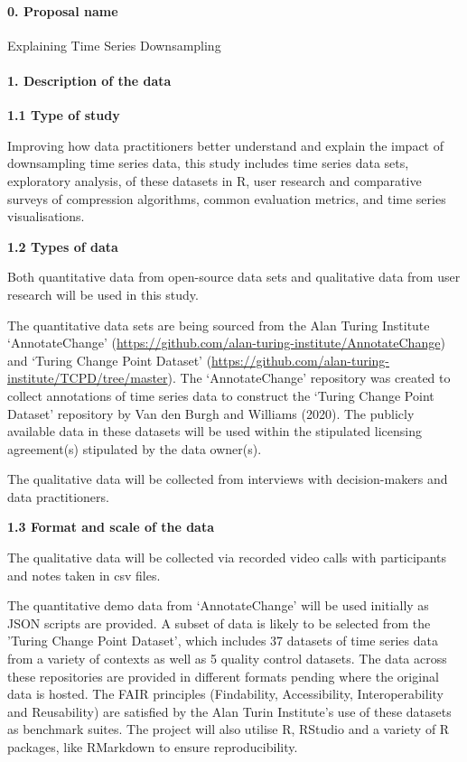 \documentclass[
]{article}
\begin{document}
\hypertarget{proposal-name}{%
\paragraph{0. Proposal name}\label{proposal-name}}

Explaining Time Series Downsampling

\hypertarget{description-of-the-data}{%
\paragraph{1. Description of the data}\label{description-of-the-data}}

\textbf{1.1 Type of study}

Improving how data practitioners better understand and explain the
impact of downsampling time series data, this study includes time series
data sets, exploratory analysis, of these datasets in R, user research
and comparative surveys of compression algorithms, common evaluation
metrics, and time series visualisations.

\textbf{1.2 Types of data}

Both quantitative data from open-source data sets and qualitative data
from user research will be used in this study.

The quantitative data sets are being sourced from the Alan Turing
Institute `AnnotateChange'
(\url{https://github.com/alan-turing-institute/AnnotateChange}) and
`Turing Change Point Dataset'
(\url{https://github.com/alan-turing-institute/TCPD/tree/master}). The
`AnnotateChange' repository was created to collect annotations of time
series data to construct the `Turing Change Point Dataset' repository by
Van den Burgh and Williams (2020). The publicly available data in these
datasets will be used within the stipulated licensing agreement(s)
stipulated by the data owner(s).

The qualitative data will be collected from interviews with
decision-makers and data practitioners.

\textbf{1.3 Format and scale of the data}

The qualitative data will be collected via recorded video calls with
participants and notes taken in csv files.

The quantitative demo data from `AnnotateChange' will be used initially
as JSON scripts are provided. A subset of data is likely to be selected
from the 'Turing Change Point Dataset', which includes 37 datasets of
time series data from a variety of contexts as well as 5 quality control
datasets. The data across these repositories are provided in different
formats pending where the original data is hosted. The FAIR principles
(Findability, Accessibility, Interoperability and Reusability) are
satisfied by the Alan Turin Institute's use of these datasets as
benchmark suites. The project will also utilise R, RStudio and a variety
of R packages, like RMarkdown to ensure reproducibility.
\end{document}
